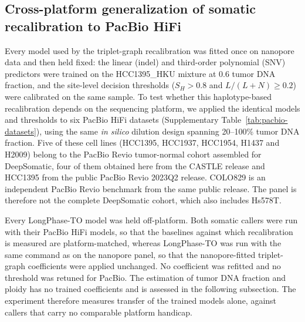 \documentclass[pdflatex,sn-nature]{sn-jnl}
\begin{document}
\subsection{Cross-platform generalization of somatic recalibration to PacBio HiFi}\label{supp:pacbio-recalibration}

Every model used by the triplet-graph recalibration was fitted once on nanopore data and then held fixed: the linear (indel) and third-order polynomial (SNV) predictors were trained on the HCC1395\_HKU mixture at 0.6 tumor DNA fraction, and the site-level decision thresholds ($S_H>0.8$ and $L/(L+N)\ge0.2$) were calibrated on the same sample. To test whether this haplotype-based recalibration depends on the sequencing platform, we applied the identical models and thresholds to six PacBio HiFi datasets (Supplementary Table~\ref{tab:pacbio-datasets}), using the same \emph{in silico} dilution design spanning 20--100\% tumor DNA fraction. Five of these cell lines (HCC1395, HCC1937, HCC1954, H1437 and H2009) belong to the PacBio Revio tumor-normal cohort assembled for DeepSomatic, four of them obtained here from the CASTLE release and HCC1395 from the public PacBio Revio 2023Q2 release. COLO829 is an independent PacBio Revio benchmark from the same public release. The panel is therefore not the complete DeepSomatic cohort, which also includes Hs578T.

Every LongPhase-TO model was held off-platform. Both somatic callers were run with their PacBio HiFi models, so that the baselines against which recalibration is measured are platform-matched, whereas LongPhase-TO was run with the same command as on the nanopore panel, so that the nanopore-fitted triplet-graph coefficients were applied unchanged. No coefficient was refitted and no threshold was retuned for PacBio. The estimation of tumor DNA fraction and ploidy has no trained coefficients and is assessed in the following subsection. The experiment therefore measures transfer of the trained models alone, against callers that carry no comparable platform handicap.
\end{document}
